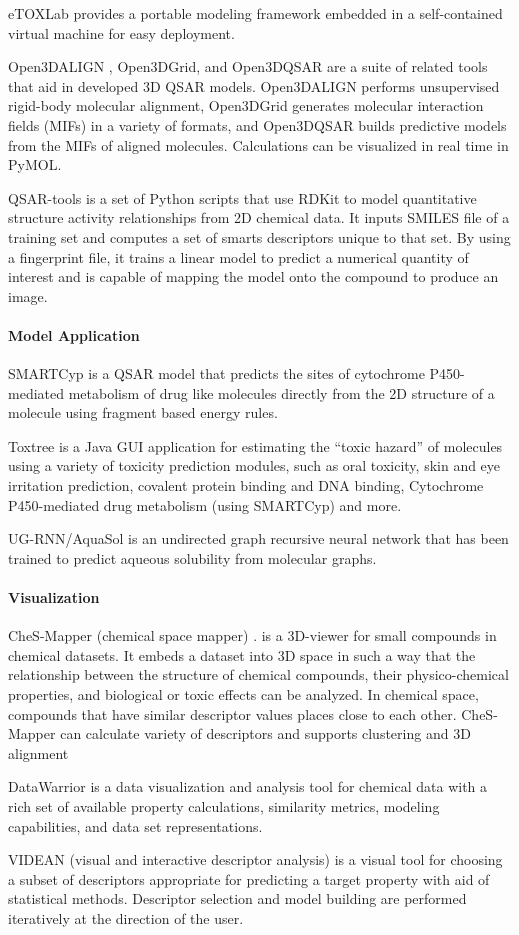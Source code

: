 eTOXLab \cite{Carri__2015} provides a portable modeling framework embedded in a self-contained virtual machine for easy deployment.

Open3DALIGN  \cite{Tosco_2011}, Open3DGrid, and Open3DQSAR \cite{Tosco_2010} are a suite of related tools that aid in developed 3D QSAR models.  Open3DALIGN performs unsupervised rigid-body molecular alignment, Open3DGrid generates molecular interaction fields (MIFs) in a variety of formats, and Open3DQSAR builds predictive models from the MIFs of aligned molecules.  Calculations can be visualized in real time in PyMOL.

QSAR-tools is a set of Python scripts that use RDKit to model quantitative structure activity relationships from 2D chemical data. It inputs SMILES file of a training set and computes a set of smarts descriptors unique to that set. By using a fingerprint file, it trains a linear model to predict a numerical quantity of interest and is capable of mapping the model onto the compound to produce an image.

\paragraph{Model Application}
SMARTCyp \cite{Rydberg_2010} is a QSAR model that predicts the sites of cytochrome P450-mediated metabolism of drug like molecules directly from the 2D structure of a molecule using fragment based energy rules.

Toxtree \cite{Patlewicz_2008} is a Java GUI application for estimating the ``toxic hazard'' of molecules using a variety of toxicity prediction modules, such as oral toxicity, skin  and eye irritation prediction, covalent protein binding and DNA binding, Cytochrome P450-mediated drug metabolism (using SMARTCyp) and more.

UG-RNN/AquaSol \cite{Lusci_2013} is an undirected graph recursive neural network that has been trained to predict aqueous solubility from molecular graphs. 

\paragraph{Visualization}
CheS-Mapper (chemical space mapper) \cite{G_tlein_2012,G_tlein_2014}. is a 3D-viewer for small compounds in chemical datasets. It embeds a dataset into 3D space in such a way that the relationship between the structure of chemical compounds, their physico-chemical properties, and biological or toxic effects can be analyzed. In chemical space, compounds that have similar descriptor values places close to each other. CheS-Mapper can calculate variety of descriptors and supports clustering and 3D alignment  

DataWarrior \cite{Sander_2015} is a data visualization and analysis tool for chemical data with a rich set of available property calculations, similarity metrics, modeling capabilities, and data set representations.

VIDEAN (visual and interactive descriptor analysis) \cite{Mart_nez_2015} is a visual tool for choosing a subset of descriptors appropriate for predicting a target property with aid of statistical methods.  Descriptor selection and model building are performed iteratively at the direction of the user.
